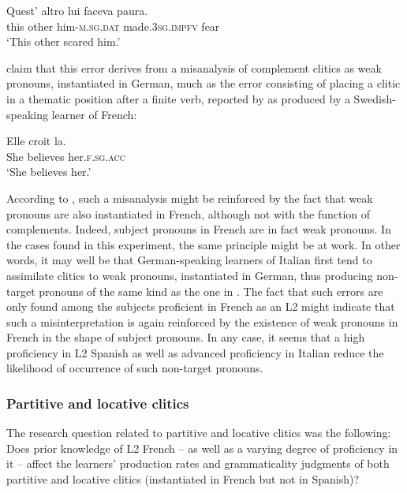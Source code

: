 \documentclass[output=paper,modfonts,nonflat,newtxmath]{langsci/langscibook}
\begin{document}
\ea \label{ex:sciutti:38}
    \gll Quest’ altro lui faceva paura. \\
         this  other   him-\textsc{m.sg.dat}  made.\textsc{3sg.impfv}   fear   \\
    \glt  ‘This other scared him.’
\z

\z


\citet{HamannBelletti2006} claim that this error derives from a misanalysis of complement clitics as weak pronouns, instantiated in German, much as the error consisting of placing a clitic in a thematic position after a finite verb, reported by \citet[355]{GranfeldtSchlyter2004} as produced by a Swedish-speaking learner of French:

\ea \label{ex:sciutti:40}
    \gll Elle croit la.\\
    She believes her.\textsc{f.sg.acc}\\
    \glt  ‘She believes her.’
\z%

According to \citet{HamannBelletti2006}, such a misanalysis might be reinforced by the fact that weak pronouns are also instantiated in French, although not with the function of complements. Indeed, subject pronouns in French are in fact weak pronouns. In the cases found in this experiment, the same principle might be at work. In other words, it may well be that German-speaking learners of Italian first tend to assimilate clitics to weak pronouns, instantiated in German, thus producing non-target pronouns of the same kind as the one in . The fact that such errors are only found among the subjects proficient in French as an L2 might indicate that such a misinterpretation is again reinforced by the existence of weak pronouns in French in the shape of subject pronouns. In any case, it seems that a high proficiency in L2 Spanish as well as advanced proficiency in Italian reduce the likelihood of occurrence of such non-target pronouns.

\subsubsection{Partitive {and} {locative} clitics} %

The research question related to partitive and locative clitics was the following: Does prior knowledge of L2 French – as well as a varying degree of proficiency in it – affect the learners’ production rates and grammaticality judgments of both partitive and locative clitics (instantiated in French but not in Spanish)?
\end{document}
